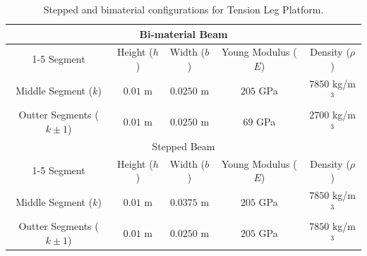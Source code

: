 \begin{table}[htbp]
\centering
\caption{Stepped and bimaterial configurations for Tension Leg Platform.}
\label{tab:sim1_values}
\begin{tabular}{ccccc}
\toprule
\multicolumn{5}{c}{Bi-material Beam} \\
\cmidrule(r){1-5}
Segment & Height ($h$) & Width ($b$) & Young Modulus ($E$) & Density ($\rho$) \\
\midrule
Middle Segment ($k$)         & $0.01$ m & $0.0250$ m & $205$ GPa & $7850$ kg/m$^3$ \\
Outter Segments ($k\pm1$) & $0.01$ m & $0.0250$ m & $69$ GPa  & $2700$ kg/m$^3$ \\
\midrule
\multicolumn{5}{c}{Stepped Beam} \\
\cmidrule(r){1-5}
Segment & Height ($h$) & Width ($b$) & Young Modulus ($E$) & Density ($\rho$) \\
\midrule
Middle Segment ($k$)         & $0.01$ m & $0.0375$ m & $205$ GPa & $7850$ kg/m$^3$ \\
Outter Segments ($k\pm1$) & $0.01$ m & $0.0250$ m & $205$ GPa & $7850$ kg/m$^3$ \\
\bottomrule
\end{tabular}
\end{table}

